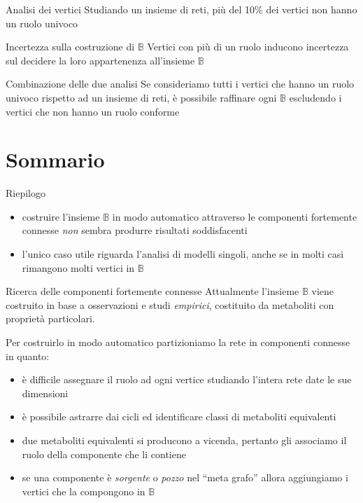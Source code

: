 \documentclass[8pt]{beamer}
\begin{document}
\begin{frame}{Analisi dei vertici}
  Studiando un insieme di reti, pi\`u del 10\% dei vertici non hanno
  un ruolo univoco
  \pause
  \begin{alertblock}{Incertezza sulla costruzione di $\mathbb{B}$}
    Vertici con pi\`u di un ruolo inducono incertezza sul decidere la
    loro appartenenza all'insieme $\mathbb{B}$
  \end{alertblock}
\end{frame}

\begin{frame}{Combinazione delle due analisi}
  Se consideriamo tutti i vertici che hanno un ruolo univoco rispetto
  ad un insieme di reti, \`e possibile raffinare ogni $\mathbb{B}$
  escludendo i vertici che non hanno un ruolo conforme
\end{frame}


\section*{Sommario}

\begin{frame}{Riepilogo}
    \begin{itemize}
    \item costruire l'insieme $\mathbb{B}$ in modo automatico
      attraverso le componenti fortemente connesse \emph{non} sembra
      produrre risultati soddisfacenti
    \item l'unico caso utile riguarda l'analisi di modelli singoli,
      anche se in molti casi rimangono molti vertici in $\mathbb{B}$
    \end{itemize}
\end{frame}

\begin{frame}{Ricerca delle componenti fortemente connesse}
  Attualmente l'insieme $\mathbb{B}$ viene costruito in base a
  osservazioni e studi \emph{empirici}, costituito da metaboliti con
  propriet\`a particolari.

  Per costruirlo in modo automatico partizioniamo la rete in
  componenti connesse in quanto:
\begin{itemize}
\item<2-> \`e difficile assegnare il ruolo ad ogni vertice studiando
  l'intera rete date le sue dimensioni
\item<3-> \`e possibile astrarre dai cicli ed identificare classi di
  metaboliti equivalenti
\item<4-> due metaboliti equivalenti si producono a vicenda, pertanto
  gli associamo il ruolo della componente che li contiene
\item<5-> se una componente \`e \emph{sorgente} o \emph{pozzo} nel
  ``meta grafo'' allora aggiungiamo i vertici che la compongono in
  $\mathbb{B}$
\end{itemize}
\end{frame}
\end{document}
